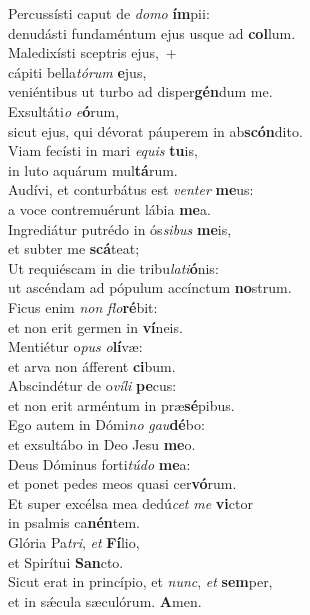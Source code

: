 \evenverse Percussísti caput de \textit{do}\textit{mo} \textbf{ím}pii:~\*\\
\evenverse denudásti fundaméntum ejus usque ad \textbf{col}lum.\\
\oddverse Maledixísti sceptris ejus,~+\\
\oddverse  cápiti bella\textit{tó}\textit{rum} \textbf{e}jus,~\*\\
\oddverse veniéntibus ut turbo ad disper\textbf{gén}dum me.\\
\evenverse Exsultáti\textit{o} \textit{e}\textbf{ó}rum,~\*\\
\evenverse sicut ejus, qui dévorat páuperem in ab\textbf{scón}dito.\\
\oddverse Viam fecísti in mari \textit{e}\textit{quis} \textbf{tu}is,~\*\\
\oddverse in luto aquárum mul\textbf{tá}rum.\\
\evenverse Audívi, et conturbátus est \textit{ven}\textit{ter} \textbf{me}us:~\*\\
\evenverse a voce contremuérunt lábia \textbf{me}a.\\
\oddverse Ingrediátur putrédo in ós\textit{si}\textit{bus} \textbf{me}is,~\*\\
\oddverse et subter me \textbf{scá}teat;\\
\evenverse Ut requiéscam in die tribu\textit{la}\textit{ti}\textbf{ó}nis:~\*\\
\evenverse ut ascéndam ad pópulum accínctum \textbf{no}strum.\\
\oddverse Ficus enim \textit{non} \textit{flo}\textbf{ré}bit:~\*\\
\oddverse et non erit germen in \textbf{ví}neis.\\
\evenverse Mentiétur o\textit{pus} \textit{o}\textbf{lí}væ:~\*\\
\evenverse et arva non áfferent \textbf{ci}bum.\\
\oddverse Abscindétur de o\textit{ví}\textit{li} \textbf{pe}cus:~\*\\
\oddverse et non erit arméntum in præ\textbf{sé}pibus.\\
\evenverse Ego autem in Dómi\textit{no} \textit{gau}\textbf{dé}bo:~\*\\
\evenverse et exsultábo in Deo Jesu \textbf{me}o.\\
\oddverse Deus Dóminus forti\textit{tú}\textit{do} \textbf{me}a:~\*\\
\oddverse et ponet pedes meos quasi cer\textbf{vó}rum.\\
\evenverse Et super excélsa mea dedú\textit{cet} \textit{me} \textbf{vi}ctor~\*\\
\evenverse in psalmis ca\textbf{nén}tem.\\
\oddverse Glória Pa\textit{tri}, \textit{et} \textbf{Fí}lio,~\*\\
\oddverse et Spirítui \textbf{San}cto.\\
\evenverse Sicut erat in princípio, et \textit{nunc}, \textit{et} \textbf{sem}per,~\*\\
\evenverse et in sǽcula sæculórum. \textbf{A}men.\\

